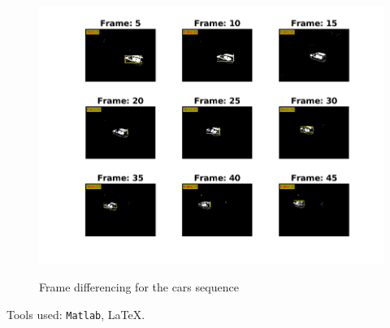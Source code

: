 \documentclass[a4paper,12pt]{article}
\begin{document}
\begin{figure}[Ht]
\centering
\includegraphics{../Videos/bgsub_framediff_cars.png}
\label{fig:fdiff_cars}
\caption{Frame differencing for the cars sequence}
\end{figure}

\vfill
\noindent Tools used: \texttt{Matlab}, \LaTeX{}.
\end{document}
